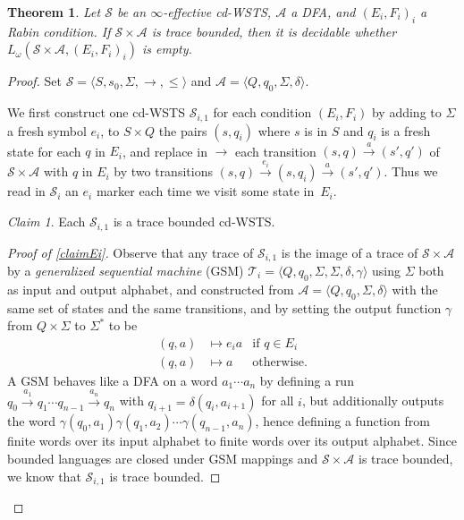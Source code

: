\documentclass[11pt,reqno,a4paper]{amsart}
\newcommand{\tup}[1]{\langle #1\rangle}
\newcommand{\ru}[1]{\xrightarrow{#1}}
\theoremstyle{plain}
\newtheorem{theorem}{Theorem}
\theoremstyle{definition}
\theoremstyle{remark}
\newtheorem{claim}{Claim}[theorem]
\begin{document}
\begin{theorem}\label{thlive}
  Let $\mathcal{S}$ be an $\infty$-effective cd-WSTS,
  $\mathcal{A}$ a DFA, and $(E_i,F_i)_i$ a Rabin condition.  If
  $\mathcal{S}\times\mathcal{A}$ is trace bounded, then it is decidable
  whether $L_\omega(\mathcal{S}\times\mathcal{A},(E_i,F_i)_i)$ is empty.
\end{theorem}
\begin{proof}
Set $\mathcal{S}=\tup{S,s_0,\Sigma,\rightarrow,\leq}$ and
  $\mathcal{A}=\tup{Q,q_0,\Sigma,\delta}$.

  We first construct one cd-WSTS
  $\mathcal{S}_{i,1}$ for 
  each condition $(E_i,F_i)$ by adding to $\Sigma$ a fresh symbol $e_i$, to
  $S\times Q$ the pairs $(s,q_i)$ where $s$ is in $S$ and $q_i$ is a
  fresh state for each $q$ in $E_i$, and
  replace in $\rightarrow$ each transition $(s,q)\ru{a}(s',q')$ of
  $\mathcal{S}\times\mathcal{A}$ with $q$ in $E_i$ by two transitions
  $(s,q)\ru{e_i}(s,q_i)\ru{a}(s',q')$.  Thus we read in $\mathcal{S}_i$
  an $e_i$ marker each time we visit some state in~$E_i$.
  \begin{claim}\label{claimEi}Each $\mathcal{S}_{i,1}$ is a trace bounded cd-WSTS.
  \end{claim}\begin{proof}[Proof of \autoref{claimEi}]
Observe that any trace of $\mathcal{S}_{i,1}$ is the image of a trace
of $\mathcal{S}\times\mathcal{A}$ by a \emph{generalized sequential
  machine} (GSM)
$\mathcal{T}_i=\tup{Q,q_0,\Sigma,\Sigma,\delta,\gamma}$ using $\Sigma$
both as input and output alphabet, and constructed
from $\mathcal{A}=\tup{Q,q_0,\Sigma,\delta}$ with the same set of states
and the same transitions, and by setting the output
function $\gamma$ from $Q\times\Sigma$ to $\Sigma^\ast$ to be
\begin{align*}
  (q,a)&\mapsto e_ia &\text{if }q\in E_i\\
  (q,a)&\mapsto a    &\text{otherwise.}
\end{align*}
A GSM behaves like a DFA on a word $a_1\cdots a_n$ by defining a run
$q_0\ru{a_1}q_1\cdots q_{n-1}\ru{a_n}q_n$ with
$q_{i+1}=\delta(q_i,a_{i+1})$ for all $i$, but additionally outputs
the word $\gamma(q_0,a_1)\gamma(q_1,a_2)\cdots\gamma(q_{n-1},a_n)$,
hence defining a function from finite words over its input alphabet to
finite words over its output alphabet.  Since bounded languages are
closed under GSM mappings \citep[Corollary on p.~348]{bcfl} and
$\mathcal{S}\times\mathcal{A}$ is trace bounded, we know that
$\mathcal{S}_{i,1}$ is trace bounded.
\end{proof}


\end{proof}
\end{document}
